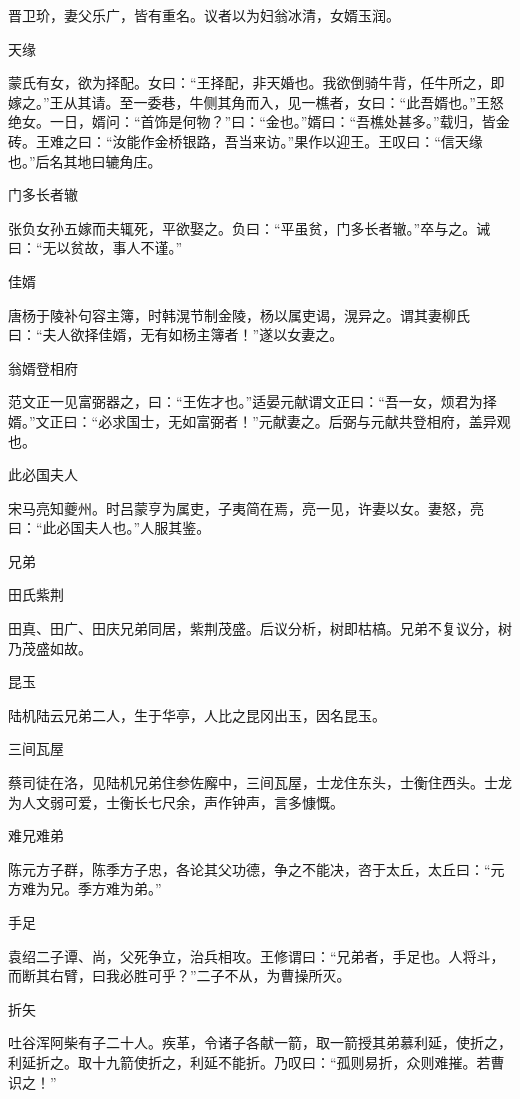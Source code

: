 \documentclass[a4paper,12pt,UTF8,twoside]{ctexbook}
\begin{document}
    晋卫玠，妻父乐广，皆有重名。议者以为妇翁冰清，女婿玉润。
    
    天缘
    
    蒙氏有女，欲为择配。女曰：“王择配，非天婚也。我欲倒骑牛背，任牛所之，即嫁之。”王从其请。至一委巷，牛侧其角而入，见一樵者，女曰：“此吾婿也。”王怒绝女。一日，婿问：“首饰是何物？”曰：“金也。”婿曰：“吾樵处甚多。”载归，皆金砖。王难之曰：“汝能作金桥银路，吾当来访。”果作以迎王。王叹曰：“信天缘也。”后名其地曰辘角庄。
    
    门多长者辙
    
    张负女孙五嫁而夫辄死，平欲娶之。负曰：“平虽贫，门多长者辙。”卒与之。诫曰：“无以贫故，事人不谨。”
    
    佳婿
    
    唐杨于陵补句容主簿，时韩滉节制金陵，杨以属吏谒，滉异之。谓其妻柳氏曰：“夫人欲择佳婿，无有如杨主簿者！”遂以女妻之。
    
    翁婿登相府
    
    范文正一见富弼器之，曰：“王佐才也。”适晏元献谓文正曰：“吾一女，烦君为择婿。”文正曰：“必求国士，无如富弼者！”元献妻之。后弼与元献共登相府，盖异观也。
    
    此必国夫人
    
    宋马亮知夔州。时吕蒙亨为属吏，子夷简在焉，亮一见，许妻以女。妻怒，亮曰：“此必国夫人也。”人服其鉴。
    
    兄弟
    
    田氏紫荆
    
    田真、田广、田庆兄弟同居，紫荆茂盛。后议分析，树即枯槁。兄弟不复议分，树乃茂盛如故。
    
    昆玉
    
    陆机陆云兄弟二人，生于华亭，人比之昆冈出玉，因名昆玉。
    
    三间瓦屋
    
    蔡司徒在洛，见陆机兄弟住参佐廨中，三间瓦屋，士龙住东头，士衡住西头。士龙为人文弱可爱，士衡长七尺余，声作钟声，言多慷慨。
    
    难兄难弟
    
    陈元方子群，陈季方子忠，各论其父功德，争之不能决，咨于太丘，太丘曰：“元方难为兄。季方难为弟。”
    
    手足
    
    袁绍二子谭、尚，父死争立，治兵相攻。王修谓曰：“兄弟者，手足也。人将斗，而断其右臂，曰我必胜可乎？”二子不从，为曹操所灭。
    
    折矢
    
    吐谷浑阿柴有子二十人。疾革，令诸子各献一箭，取一箭授其弟慕利延，使折之，利延折之。取十九箭使折之，利延不能折。乃叹曰：“孤则易折，众则难摧。若曹识之！”
    
\end{document}
